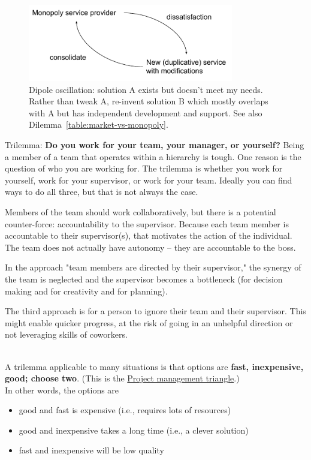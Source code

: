 \begin{figure}[ht]
    \centering
    \includegraphics[width=0.8\textwidth]{images/dilemma_market_vs_monopoly.pdf}
    \caption{Dipole oscillation: solution A exists but doesn't meet my needs. Rather than tweak A, re-invent solution B which mostly overlaps with A but has independent development and support. See also Dilemma~\ref{table:market-vs-monopoly}.}
    \label{fig:market-vs-monopoly}
\end{figure}


Trilemma: \textbf{Do you work for your team, your manager, or yourself?}
Being a member of a team that operates within a hierarchy is tough. One reason is the question of who you are working for. The trilemma is whether you work for yourself, work for your supervisor, or work for your team.  Ideally you can find ways to do all three, but that is not always the case. 

Members of the team should work collaboratively, but there is a potential counter-force: accountability to the supervisor. Because each team member is accountable to their supervisor(s), that motivates the action of the individual. The team does not actually have autonomy -- they are accountable to the boss.

In the approach "team members are directed by their supervisor," the synergy of the team is neglected and the supervisor becomes a bottleneck (for decision making and for creativity and for planning).

The third approach is for a person to ignore their team and their supervisor. This might enable quicker progress, at the risk of going in an unhelpful direction or not leveraging skills of coworkers. 

\ \\

A trilemma applicable to many situations is that options are \textbf{fast, inexpensive, good; choose two}. (This is the \href{https://en.wikipedia.org/wiki/Project_management_triangle}{Project management triangle}.) \\
In other words, the options are
\begin{itemize}
    \item good and fast is expensive (i.e., requires lots of resources)
    \item good and inexpensive takes a long time (i.e., a clever solution)
    \item fast and inexpensive will be low quality
\end{itemize}

